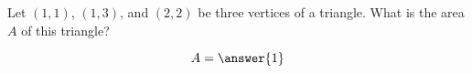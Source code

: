 \documentclass{ximera}
\author{Gregory Hartman \and Matthew Carr}
\begin{document}
\begin{exercise}



Let $(1,1)$, $(1,3)$, and $(2,2)$ be three vertices of a triangle. What is the area $A$ of this triangle?
\begin{prompt}
\[
A=\answer{1}
\]
\end{prompt}


\end{exercise}
\end{document}
